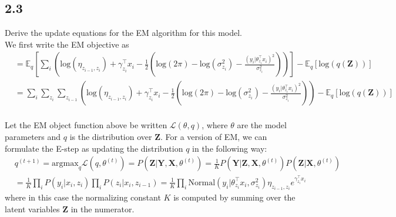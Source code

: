 \documentclass[12pt]{article}
\begin{document}
\subsection*{2.3}
Derive the update equations for the EM algorithm for this model.
\\

We first write the EM objective as
\begin{equation}
    \begin{split}
        &= \mathbb{E}_q \left[ \sum_i \left( \text{log}(\eta_{z_{i-1},z_i}) + \gamma_{z_i}^{\top} x_i 
             -\frac{1}{2}\left( \text{log}(2\pi) - \text{log}(\sigma_{z_i}^2) - \frac{(y_i | \theta_{z_i}^{\top} x_i)^2}{ \sigma_{z_i}^2} \right)  \right) \right]
             - \mathbb{E}_q \left[\text{log} \left( q(\textbf{Z}) \right) \right] \\
         &=  \sum_i \sum_{z_i} \sum_{z_{i-1}} \left( \text{log}(\eta_{z_{i-1},z_i}) + \gamma_{z_i}^{\top} x_i 
             -\frac{1}{2}\left( \text{log}(2\pi) - \text{log}(\sigma_{z_i}^2) - \frac{(y_i | \theta_{z_i}^{\top} x_i)^2}{ \sigma_{z_i}^2} \right)  \right)
             - \mathbb{E}_q \left[\text{log} \left( q(\textbf{Z}) \right) \right] \\
    \end{split}
\end{equation}

Let the EM object function above be written $\mathcal{L}(\theta,q)$, where $\theta$ are the model parameters and $q$ is the distribution over $\textbf{Z}$. For a version of EM, we can formulate the E-step as updating the distribution $q$ in the following way: 
\begin{equation}
    \begin{split}
        & q^{(t+1)} = \text{argmax}_q \mathcal{L}(q,\theta^{(t)}) = P(\textbf{Z} | \textbf{Y}, \textbf{X}, \theta^{(t)})
            = \frac{1}{K} P(\textbf{Y} | \textbf{Z}, \textbf{X}, \theta^{(t)}) P(\textbf{Z} | \textbf{X}, \theta^{(t)}) \\
        & = \frac{1}{K} \prod_i P(y_i | x_i, z_i) \prod_i P(z_i | x_i, z_{i-1})
            = \frac{1}{K} \prod_i \text{Normal}(y_i | \theta_{z_i}^{\top} x_i, \sigma_{z_i}^2)  
            \eta_{z_{i-1},z_i} e^{\gamma_{z_i}^{\top} x_i}
    \end{split}
\end{equation}
where in this case the normalizing constant $K$ is computed by summing over the latent variables $\textbf{Z}$ in the numerator.
\\
\end{document}
